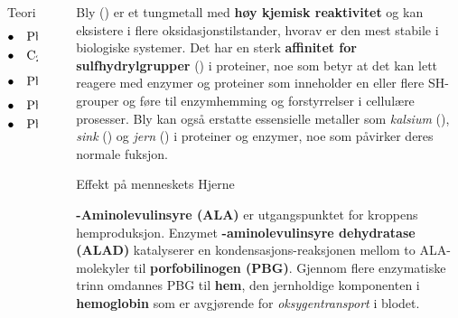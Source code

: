 \documentclass[final]{beamer}
\newlength{\sepwidth}
\newlength{\colwidth}
\newcommand{\separatorcolumn}{\begin{column}{\sepwidth}\end{column}}
\begin{document}
\begin{frame}[t]
\begin{columns}[t]
\begin{column}{\colwidth}
\begin{block}{Teori}
				\begingroup
				\vspace{-0.5cm}
				\Large
				\begin{align}
					\bullet \quad \ce{ & Pb(C2H5)4 -> Pb^{2+} + 4 C2H5^{.}} \\
					\bullet \quad \ce{ & C2H5^{.} + ROO^{.} -> C2H5OOR}     \\
					\bullet \quad \ce{ & Pb + 1/2 O2 -> PbO}                \\
					\bullet \quad \ce{ & PbO + C2H4Br2 -> PbBr2 + C2H4O}    \\
					\bullet \quad \ce{ & PbO + C2H4Cl2 -> PbCl2 + C2H4O}
				\end{align}
				\endgroup
			\end{block}
		\end{column}

		\separatorcolumn

		\begin{column}{\colwidth}
			\vspace{1cm}

			Bly () er et tungmetall med \textbf{høy kjemisk reaktivitet} og kan eksistere i flere
			oksidasjonstilstander, hvorav  er den mest stabile i biologiske systemer. Det har
			en sterk \textbf{affinitet for sulfhydrylgrupper} () i proteiner, noe som betyr at det
			kan lett reagere med enzymer og proteiner som inneholder en eller flere SH-grouper og føre til
			enzymhemming og forstyrrelser i cellulære prosesser. Bly kan også erstatte essensielle
			metaller som \textit{kalsium} (), \textit{sink} () og \textit{jern}
			() i proteiner og enzymer, noe som påvirker deres normale fuksjon.

			\vspace{0.5cm}

			\begin{block}{Effekt på menneskets Hjerne}

				\textbf{\delta-Aminolevulinsyre (ALA)} er utgangspunktet for kroppens hemproduksjon. Enzymet
				\textbf{\delta-aminolevulinsyre dehydratase (ALAD)} katalyserer en kondensasjons-reaksjonen
				mellom to ALA-molekyler til \textbf{porfobilinogen (PBG)}. Gjennom flere enzymatiske trinn
				omdannes PBG til \textbf{hem}, den jernholdige komponenten i \textbf{hemoglobin} som er
				avgjørende for \textit{oksygentransport} i blodet.



\end{block}
\end{column}
\end{columns}
\end{frame}
\end{document}
